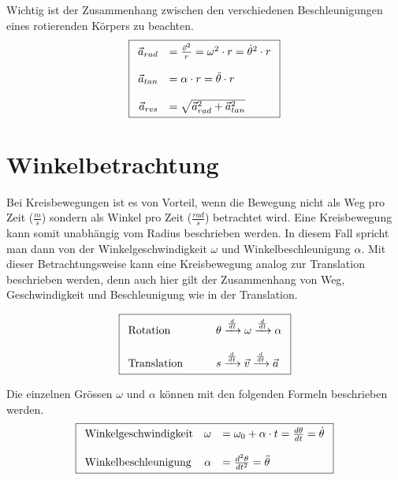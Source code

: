 \noindent
Wichtig ist der Zusammenhang zwischen den verschiedenen Beschleunigungen
eines rotierenden Körpers zu beachten.
\[ \boxed{\begin{array}{r l}
	\vec{a}_{rad} & = \frac{\vec{v}^2}{r} 
		= \omega^2 \cdot r 
		= \dot{\theta}^2 \cdot r \\
	& \\
	\vec{a}_{tan} & = \alpha \cdot r
		= \ddot{\theta} \cdot r \\
	& \\
	\vec{a}_{res} & = \sqrt{\vec{a}_{rad}^2 + \vec{a}_{tan}^2} 
\end{array} }\]

\section{Winkelbetrachtung}\label{sec:winkelbetrachtung}
Bei Kreisbewegungen ist es von Vorteil, wenn die Bewegung nicht als
Weg pro Zeit ($\frac{m}{s}$) sondern als Winkel pro Zeit 
($\frac{rad}{s}$) betrachtet wird. Eine Kreisbewegung kann somit 
unabhängig vom Radius beschrieben werden. In diesem Fall spricht
man dann von der Winkelgeschwindigkeit $\omega$ und 
Winkelbeschleunigung $\alpha$. Mit dieser Betrachtungsweise kann
eine Kreisbewegung analog zur Translation beschrieben werden, denn
auch hier gilt der Zusammenhang von Weg, Geschwindigkeit und 
Beschleunigung wie in der Translation.

\[ \boxed{ \begin{array}{l l}
	\text{Rotation} \qquad &
		\theta
		\xrightarrow{\frac{d}{dt}} \omega 
		\xrightarrow{\frac{d}{dt}} \alpha \\
	& \\
	\text{Translation} \qquad &
		s
		\xrightarrow{\frac{d}{dt}} \vec{v} 
		\xrightarrow{\frac{d}{dt}} \vec{a}
\end{array} }\]

\noindent
Die einzelnen Grössen $\omega$ und $\alpha$ können mit den folgenden 
Formeln beschrieben werden.
\[ \boxed{\begin{array}{l r l}
	\text{Winkelgeschwindigkeit} &
		\omega & = \omega_0 + \alpha \cdot t 
			= \frac{d\theta}{dt} 
			= \dot{\theta} \\
	& & \\
	\text{Winkelbeschleunigung} &
		\alpha & = \frac{d^2\theta}{dt^2} = \ddot{\theta}
\end{array} }\]

